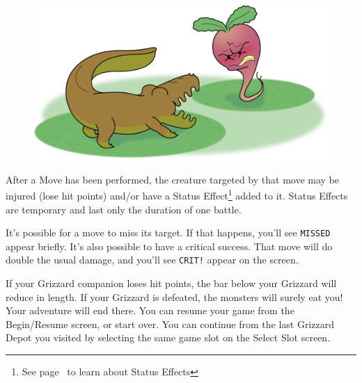 \documentclass[9pt,twocolumn,openany,article]{memoir}
\begin{document}
\begin{figure}[b]
  \begin{center}
    \includegraphics[width=2\columnwidth,height=\columnwidth]{../Manual/GrizzardCombat.png}
  \end{center}
\end{figure}

After a Move has been performed,  the creature targeted by that move may
be injured  (lose hit points)  and/or have a  Status Effect\footnote{See
  page~\pageref{sec:StatusEffects} to learn  about Status Effects} added
to  it. Status  Effects  are temporary  and last  only  the duration  of
one battle.

It's possible for a move to miss its target. If that happens, you'll see
\texttt{MISSED} appear  briefly. It's also  possible to have  a critical
success.  That move  will do  double the  usual damage,  and you'll  see
\texttt{CRIT!} appear on the screen.

If your Grizzard companion loses hit points, the bar below your Grizzard
will reduce in  length. If your Grizzard is defeated,  the monsters will
surely eat you! Your adventure will end there. \ifdefined\NOSAVE You can
resume your game from the Begin/Resume  screen, or start over. \else You
can continue from  the last Grizzard Depot you visited  by selecting the
same game slot on the Select Slot screen. \fi
\end{document}
